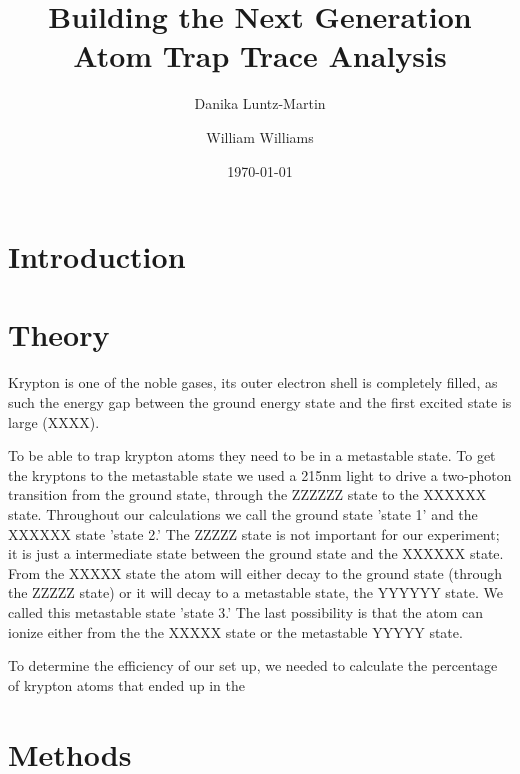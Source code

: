 \documentclass[prb,preprint]{revtex4-1}
\begin{document}
\title{Building the Next Generation Atom Trap Trace Analysis}


\author{Danika Luntz-Martin}

\author{William Williams}

\date{\today}

\begin{abstract}


\end{abstract}


\maketitle 


\section{Introduction} 


\section{Theory}

Krypton is one of the noble gases, its outer electron shell is completely filled, as such the energy gap between the ground energy state and the first excited state is large (XXXX). 

To be able to trap krypton atoms they need to be in a metastable state. To get the kryptons to the metastable state we used a 215nm light to drive a two-photon transition from the ground state, through the ZZZZZZ state to the XXXXXX state. Throughout our calculations we call the ground state 'state 1' and the XXXXXX state 'state 2.' The ZZZZZ state is not important for our experiment; it is just a intermediate state between the ground state and the XXXXXX state. From the XXXXX state the atom will either decay to the ground state (through the ZZZZZ state) or it will decay to a metastable state, the YYYYYY state. We called this metastable state 'state 3.' The last possibility is that the atom can ionize either from the the XXXXX state or the metastable YYYYY state.

To determine the efficiency of our set up, we needed to calculate the percentage of krypton atoms that ended up in the 

\section{Methods}
\end{document}
